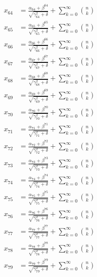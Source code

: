 \documentclass{article}
\begin{document}
\begin{align}
  x_{64} &= \frac{\alpha_{64} + \beta^{64}}{\sqrt{\gamma_{64}^2 + \delta}} + \sum_{k=0}^{\infty} \binom{n}{k} \label{eq:64} \\
  x_{65} &= \frac{\alpha_{65} + \beta^{65}}{\sqrt{\gamma_{65}^2 + \delta}} + \sum_{k=0}^{\infty} \binom{n}{k} \label{eq:65} \\
  x_{66} &= \frac{\alpha_{66} + \beta^{66}}{\sqrt{\gamma_{66}^2 + \delta}} + \sum_{k=0}^{\infty} \binom{n}{k} \label{eq:66} \\
  x_{67} &= \frac{\alpha_{67} + \beta^{67}}{\sqrt{\gamma_{67}^2 + \delta}} + \sum_{k=0}^{\infty} \binom{n}{k} \label{eq:67} \\
  x_{68} &= \frac{\alpha_{68} + \beta^{68}}{\sqrt{\gamma_{68}^2 + \delta}} + \sum_{k=0}^{\infty} \binom{n}{k} \label{eq:68} \\
  x_{69} &= \frac{\alpha_{69} + \beta^{69}}{\sqrt{\gamma_{69}^2 + \delta}} + \sum_{k=0}^{\infty} \binom{n}{k} \label{eq:69} \\
  x_{70} &= \frac{\alpha_{70} + \beta^{70}}{\sqrt{\gamma_{70}^2 + \delta}} + \sum_{k=0}^{\infty} \binom{n}{k} \label{eq:70} \\
  x_{71} &= \frac{\alpha_{71} + \beta^{71}}{\sqrt{\gamma_{71}^2 + \delta}} + \sum_{k=0}^{\infty} \binom{n}{k} \label{eq:71} \\
  x_{72} &= \frac{\alpha_{72} + \beta^{72}}{\sqrt{\gamma_{72}^2 + \delta}} + \sum_{k=0}^{\infty} \binom{n}{k} \label{eq:72} \\
  x_{73} &= \frac{\alpha_{73} + \beta^{73}}{\sqrt{\gamma_{73}^2 + \delta}} + \sum_{k=0}^{\infty} \binom{n}{k} \label{eq:73} \\
  x_{74} &= \frac{\alpha_{74} + \beta^{74}}{\sqrt{\gamma_{74}^2 + \delta}} + \sum_{k=0}^{\infty} \binom{n}{k} \label{eq:74} \\
  x_{75} &= \frac{\alpha_{75} + \beta^{75}}{\sqrt{\gamma_{75}^2 + \delta}} + \sum_{k=0}^{\infty} \binom{n}{k} \label{eq:75} \\
  x_{76} &= \frac{\alpha_{76} + \beta^{76}}{\sqrt{\gamma_{76}^2 + \delta}} + \sum_{k=0}^{\infty} \binom{n}{k} \label{eq:76} \\
  x_{77} &= \frac{\alpha_{77} + \beta^{77}}{\sqrt{\gamma_{77}^2 + \delta}} + \sum_{k=0}^{\infty} \binom{n}{k} \label{eq:77} \\
  x_{78} &= \frac{\alpha_{78} + \beta^{78}}{\sqrt{\gamma_{78}^2 + \delta}} + \sum_{k=0}^{\infty} \binom{n}{k} \label{eq:78} \\
  x_{79} &= \frac{\alpha_{79} + \beta^{79}}{\sqrt{\gamma_{79}^2 + \delta}} + \sum_{k=0}^{\infty} \binom{n}{k} \label{eq:79} \\

\end{align}
\end{document}
